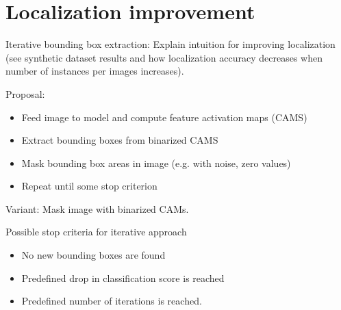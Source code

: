 \section{Localization improvement}
Iterative bounding box extraction: Explain intuition for improving localization (see synthetic dataset results and how localization accuracy decreases when number of instances per images increases).

Proposal:
\begin{itemize}
    \item Feed image to model and compute feature activation maps (CAMS)
    \item Extract bounding boxes from binarized CAMS
    \item Mask bounding box areas in image (e.g. with noise, zero values)
    \item Repeat until some stop criterion
\end{itemize}
Variant: Mask image with binarized CAMs.

Possible stop criteria for iterative approach
\begin{itemize}
    \item No new bounding boxes are found
    \item Predefined drop in classification score is reached
    \item Predefined number of iterations is reached.
\end{itemize}